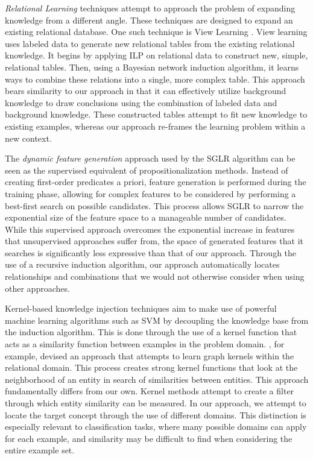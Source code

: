 \documentclass[twoside,11pt]{article}
\theoremstyle{definition}
\begin{document}
\emph{Relational Learning} techniques attempt to approach the problem of expanding knowledge from a different angle. These techniques are designed to expand an existing relational database. One such technique is View Learning . View learning uses labeled data to generate new relational tables from the existing relational knowledge.
It begins by applying ILP on relational data to construct new, simple, relational tables. Then,  using a Bayesian network induction algorithm, it learns ways to combine these relations into a single, more complex table.
This approach bears similarity to our approach in that it can effectively utilize background knowledge to draw conclusions using the combination of labeled data and background knowledge. These constructed tables attempt to fit new knowledge to existing examples, whereas our approach re-frames the learning problem within a new context.

The \emph{dynamic feature generation} approach used by the SGLR algorithm \cite{popescul200716} can be seen as the supervised equivalent of propositionalization methods. Instead of creating first-order predicates a priori, feature generation is performed during the training phase, allowing for complex features to be considered by performing a best-first search on possible candidates.
This process allows SGLR to narrow the exponential size of the feature space to a manageable number of candidates.
While this supervised approach overcomes the exponential increase in features that unsupervised approaches suffer from, the space of generated features that it searches is significantly less expressive than that of our approach.
Through the use of a recursive induction algorithm, our approach automatically locates relationships and combinations that we would not otherwise consider when using other approaches.

Kernel-based knowledge injection techniques aim to make use of powerful machine learning algorithms such as SVM by decoupling the knowledge base from the induction algorithm. This is done through the use of a kernel function that acts as a similarity function between examples in the problem domain. , for example, devised an approach that attempts to learn graph kernels within the relational domain. This process creates strong kernel functions that look at the neighborhood of an entity in search of similarities between entities. This  approach fundamentally differs from our own. Kernel methods attempt to create a filter through which entity similarity can be measured. In our approach, we attempt to locate the target concept through the use of different domains. This distinction is especially relevant to classification tasks, where many possible domains can apply for each example, and similarity may be difficult to find when considering the entire example set.
\end{document}
